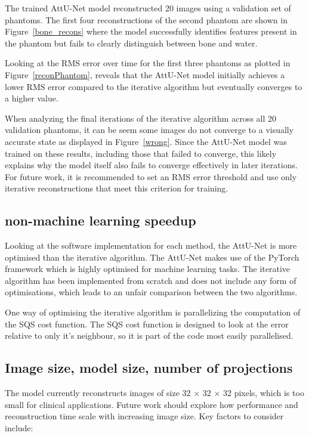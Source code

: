\documentclass{article}
\begin{document}
The trained AttU-Net model reconstructed 20 images using a validation set of phantoms. The first four reconstructions of the second phantom are shown in Figure~\ref{bone_recons} where the model successfully identifies features present in the phantom but fails to clearly distinguish between bone and water.

Looking at the RMS error over time for the first three phantoms as plotted in Figure~\ref{reconPhantom}, reveals that the AttU-Net model initially achieves a lower RMS error compared to the iterative algorithm but eventually converges to a higher value.

When analyzing the final iterations of the iterative algorithm across all 20 validation phantoms, it can be seem some images do not converge to a visually accurate state as displayed in Figure~\ref{wrong}. Since the AttU-Net model was trained on these results, including those that failed to converge, this likely explains why the model itself also fails to converge effectively in later iterations. For future work, it is recommended to set an RMS error threshold and use only iterative reconstructions that meet this criterion for training.

\subsection{non-machine learning speedup}

Looking at the software implementation for each method, the AttU-Net is more optimised than the iterative algorithm. The AttU-Net makes use of the PyTorch framework which is highly optimised for machine learning tasks. The iterative algorithm has been implemented from scratch and does not include any form of optimisations, which leads to an unfair comparison between the two algorithms.

One way of optimising the iterative algorithm is parallelizing the computation of the SQS cost function. The SQS cost function is designed to look at the error relative to only it's neighbour, so it is part of the code most easily parallelised.

\subsection{Image size, model size, number of projections}

The model currently reconstructs images of size 32 $\times$ 32 $\times$ 32 pixels, which is too small for clinical applications. Future work should explore how performance and reconstruction time scale with increasing image size. Key factors to consider include:
\end{document}
